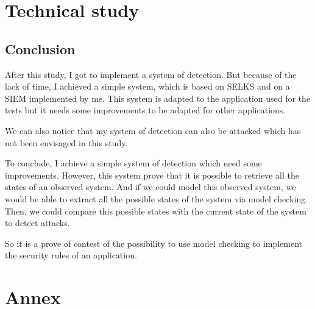 \documentclass[a4paper, 11pt, oneside, oldfontcommands]{memoir}
\newcounter{th}[chapter]
\begin{document}
\part{Technical study}
  
  
  




\chapter*{Conclusion}


After this study, I got to implement a system of detection. But because of the lack of time, I achieved a simple
system, which is based on SELKS and on a SIEM implemented by me. This system is adapted to the application used for
the tests but it needs some improvements to be adapted for other applications.

We can also notice that my system of detection can also be attacked which has not been envisaged in this study.

To conclude, I achieve a simple system of detection which need some improvements. However, this system prove that
it is possible to retrieve all the states of an observed system. And if we could model this observed system, we
would be able to extract all the possible states of the system via model checking. Then, we could compare this
possible states with the current state of the system to detect attacks.

So it is a prove of contest of the possibility to use model checking to implement the security rules of an
application.




\newpage


\part*{Annex}
\appendix
\nocite{*}

\newpage
 \listoffigures
 \printindex
 
  
\end{document}
